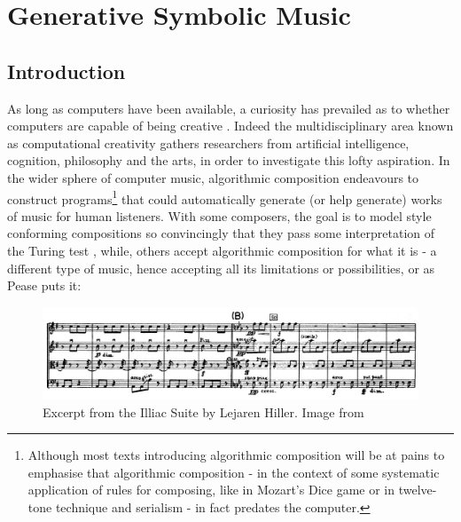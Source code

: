 \chapter{Generative Symbolic Music}
\label{chap:symbolic}

\section{Introduction}

As long as computers have been available, a curiosity has prevailed as to whether computers are capable of being creative \citep{Cardoso2009}. Indeed the multidisciplinary area known as computational creativity \citep{Boden1998, Wiggins2006, Boden2009a, Boden2009, Colton2012} gathers researchers from artificial intelligence, cognition, philosophy and the arts, in order to investigate this lofty aspiration. In the wider sphere of computer music, algorithmic composition \citep{Jacob1996, Fernandez2013} endeavours to construct programs\footnote{Although most texts introducing algorithmic composition will be at pains to emphasise that algorithmic composition - in the context of some systematic application of rules for composing, like in Mozart's Dice game or in twelve-tone technique and serialism - in fact predates the computer.} that could automatically generate (or help generate) works of music for human listeners. With some composers, the goal is to model style conforming compositions \citep{Cope1987, Cope1991} so convincingly that they pass some interpretation of the Turing test \citep{Ariza2009}, while, others accept algorithmic composition for what it is - a different type of music, hence accepting all its limitations or possibilities, or as Pease puts it:

\begin{figure}
	\begin{center}
		\includegraphics[width=\figSizeHundred]{ch03_symbolic/figures/illiac.jpg}
	\end{center}
	\caption[Excerpt from the \textit{Illiac Suite} (Lejaren Hiller)]{Excerpt from the Illiac Suite by Lejaren Hiller. Image from \cite{Morgan2015}}
	\label{fig:illiac}
\end{figure}

